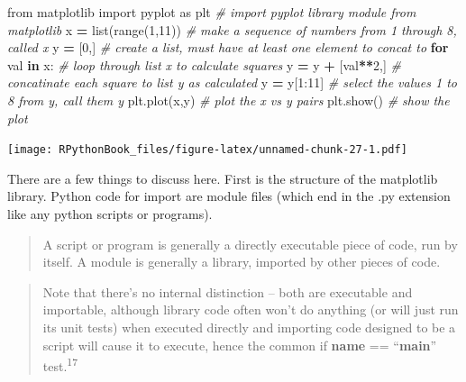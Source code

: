 \documentclass[]{book}
\newenvironment{Shaded}{\begin{snugshade}}{\end{snugshade}}
\newcommand{\KeywordTok}[1]{\textcolor[rgb]{0.13,0.29,0.53}{\textbf{#1}}}
\newcommand{\DecValTok}[1]{\textcolor[rgb]{0.00,0.00,0.81}{#1}}
\newcommand{\ImportTok}[1]{#1}
\newcommand{\CommentTok}[1]{\textcolor[rgb]{0.56,0.35,0.01}{\textit{#1}}}
\newcommand{\ControlFlowTok}[1]{\textcolor[rgb]{0.13,0.29,0.53}{\textbf{#1}}}
\newcommand{\OperatorTok}[1]{\textcolor[rgb]{0.81,0.36,0.00}{\textbf{#1}}}
\newcommand{\BuiltInTok}[1]{#1}
\newcommand{\NormalTok}[1]{#1}
\theoremstyle{definition}
\theoremstyle{definition}
\theoremstyle{definition}
\theoremstyle{remark}
\begin{document}
\begin{Shaded}
\begin{Highlighting}[]
\ImportTok{from}\NormalTok{ matplotlib }\ImportTok{import}\NormalTok{ pyplot }\ImportTok{as}\NormalTok{ plt  }\CommentTok{# import pyplot library module from matplotlib}
\NormalTok{x }\OperatorTok{=} \BuiltInTok{list}\NormalTok{(}\BuiltInTok{range}\NormalTok{(}\DecValTok{1}\NormalTok{,}\DecValTok{11}\NormalTok{))                  }\CommentTok{# make a sequence of numbers from 1 through 8, called x}
\NormalTok{y }\OperatorTok{=}\NormalTok{ [}\DecValTok{0}\NormalTok{,]                              }\CommentTok{# create a list, must have at least one element to concat to}
\ControlFlowTok{for}\NormalTok{ val }\KeywordTok{in}\NormalTok{ x:                         }\CommentTok{# loop through list x to calculate squares}
\NormalTok{    y }\OperatorTok{=}\NormalTok{ y }\OperatorTok{+}\NormalTok{ [val}\OperatorTok{**}\DecValTok{2}\NormalTok{,]                 }\CommentTok{# concatinate each square to list y as calculated}
\NormalTok{y }\OperatorTok{=}\NormalTok{ y[}\DecValTok{1}\NormalTok{:}\DecValTok{11}\NormalTok{]                            }\CommentTok{# select the values 1 to 8 from y, call them y}
\NormalTok{plt.plot(x,y)                         }\CommentTok{# plot the x vs y pairs}
\NormalTok{plt.show()                            }\CommentTok{# show the plot}
\end{Highlighting}
\end{Shaded}

\texttt{[image: RPythonBook\_files/figure-latex/unnamed-chunk-27-1.pdf]}

There are a few things to discuss here. First is the structure of the
matplotlib library. Python code for import are module files (which end
in the .py extension like any python scripts or programs).

\begin{quote}
A script or program is generally a directly executable piece of code,
run by itself. A module is generally a library, imported by other pieces
of code.
\end{quote}

\begin{quote}
Note that there's no internal distinction -- both are executable and
importable, although library code often won't do anything (or will just
run its unit tests) when executed directly and importing code designed
to be a script will cause it to execute, hence the common if
\textbf{name} == ``\textbf{main}'' test.\textsuperscript{17}
\end{quote}
\end{document}
